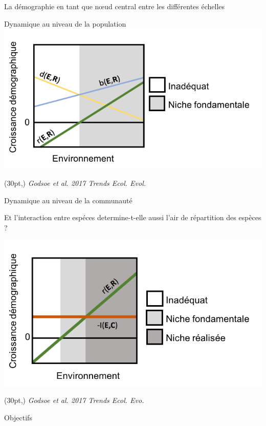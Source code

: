 \documentclass[11pt, compress, aspectratio=1610]{beamer}
\newcommand\smallcitation[1]{%
\begin{textblock*}{\textwidth}(30pt,\textheight)
	\raggedleft \footnotesize\textit{#1}
\end{textblock*}}
\begin{document}
\begin{frame}{La démographie en tant que nœud central entre les
différentes échelles}
\begin{frame}{Dynamique au niveau de la population}
\includegraphics[scale=0.685]{figures/Godsoe2017a.png}

\par

\smallcitation{Godsoe et al. 2017 Trends Ecol. Evol.}

\end{frame}

\begin{frame}{Dynamique au niveau de la communauté}
\protect\hypertarget{dynamique-au-niveau-de-la-communautuxe9}{}

Et l’interaction entre espéces determine-t-elle aussi l’air de
répartition des espèces ?

\centering

\includegraphics[scale=0.685]{figures/Godsoe2017b.png}

\par

\smallcitation{Godsoe et al. 2017 Trends Ecol. Evo.}

\end{frame}

\begin{frame}{Objectifs}
\protect\hypertarget{objectifs-2}{}


\end{frame}
\end{frame}
\end{document}
